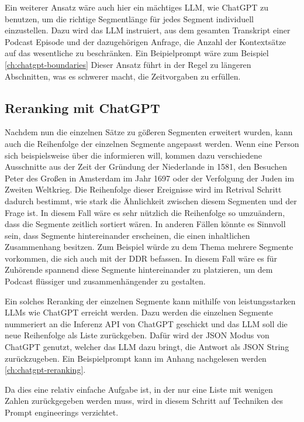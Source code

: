 Ein weiterer Ansatz wäre auch hier ein mächtiges LLM, wie ChatGPT zu benutzen, um die richtige Segmentlänge für jedes Segment individuell einzustellen.
Dazu wird das LLM instruiert, aus dem gesamten Transkript einer Podcast Episode und der dazugehörigen Anfrage, die Anzahl der Kontextsätze auf das wesentliche zu beschränken.
Ein Beipielprompt wäre zum Beispiel \autoref{ch:chatgpt-boundaries}
Dieser Ansatz führt in der Regel zu längeren Abschnitten, was es schwerer macht, die Zeitvorgaben zu erfüllen.

\subsection{Reranking mit ChatGPT}

Nachdem nun die einzelnen Sätze zu gößeren Segmenten erweitert wurden, kann auch die Reihenfolge der einzelnen Segmente angepasst werden.
Wenn eine Person sich beispielsweise über die  informieren will, kommen dazu verschiedene Ausschnitte aus der Zeit der Gründung der Niederlande in 1581, den Besuchen Peter des Großen in Amsterdam im Jahr 1697 oder der Verfolgung der Juden im Zweiten Weltkrieg.
Die Reihenfolge dieser Ereignisse wird im Retrival Schritt dadurch bestimmt, wie stark die Ähnlichkeit zwischen diesem Segmenten und der Frage ist.
In diesem Fall wäre es sehr nützlich die Reihenfolge so umzuändern, dass die Segmente zeitlich sortiert wären.
In anderen Fällen könnte es Sinnvoll sein, dass Segmente hintereinander erscheinen, die einen inhaltlichen Zusammenhang besitzen.
Zum Beispiel würde zu dem Thema  mehrere Segmente vorkommen, die sich auch mit der DDR befassen.
In diesem Fall wäre es für Zuhörende spannend diese Segmente hintereinander zu platzieren, um dem Podcast flüssiger und zusammenhängender zu gestalten.

Ein solches Reranking der einzelnen Segmente kann mithilfe von leistungsstarken LLMs wie ChatGPT erreicht werden.
Dazu werden die einzelnen Segmente nummeriert an die Inferenz API von ChatGPT geschickt und das LLM soll die neue Reihenfolge als Liste zurückgeben.
Dafür wird der JSON Modus von ChatGPT genutzt, welcher das LLM dazu bringt, die Antwort als JSON String zurückzugeben.
Ein Beispielprompt kann im Anhang nachgelesen werden \autoref{ch:chatgpt-reranking}.

Da dies eine relativ einfache Aufgabe ist, in der nur eine Liste mit wenigen Zahlen zurückgegeben werden muss, wird in diesem Schritt auf Techniken des Prompt engineerings verzichtet.

